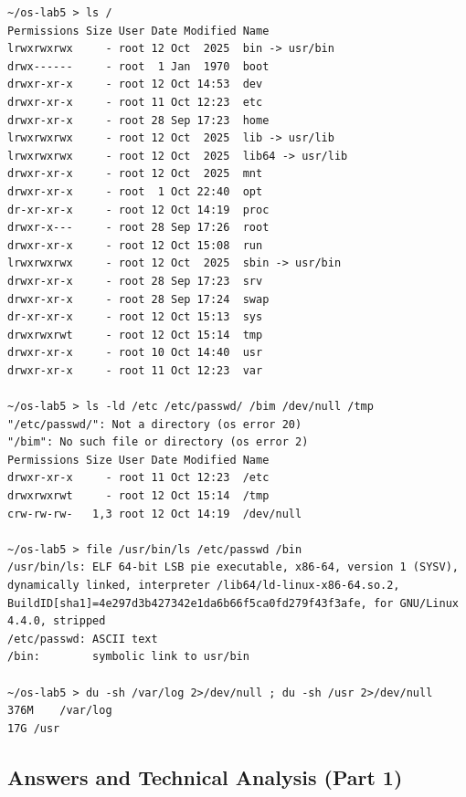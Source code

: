 \documentclass[12pt,a4paper]{article}
\begin{document}
\begin{lstlisting}[style=consolestyle]
~/os-lab5 > ls /
Permissions Size User Date Modified Name
lrwxrwxrwx     - root 12 Oct  2025  bin -> usr/bin
drwx------     - root  1 Jan  1970  boot
drwxr-xr-x     - root 12 Oct 14:53  dev
drwxr-xr-x     - root 11 Oct 12:23  etc
drwxr-xr-x     - root 28 Sep 17:23  home
lrwxrwxrwx     - root 12 Oct  2025  lib -> usr/lib
lrwxrwxrwx     - root 12 Oct  2025  lib64 -> usr/lib
drwxr-xr-x     - root 12 Oct  2025  mnt
drwxr-xr-x     - root  1 Oct 22:40  opt
dr-xr-xr-x     - root 12 Oct 14:19  proc
drwxr-x---     - root 28 Sep 17:26  root
drwxr-xr-x     - root 12 Oct 15:08  run
lrwxrwxrwx     - root 12 Oct  2025  sbin -> usr/bin
drwxr-xr-x     - root 28 Sep 17:23  srv
drwxr-xr-x     - root 28 Sep 17:24  swap
dr-xr-xr-x     - root 12 Oct 15:13  sys
drwxrwxrwt     - root 12 Oct 15:14  tmp
drwxr-xr-x     - root 10 Oct 14:40  usr
drwxr-xr-x     - root 11 Oct 12:23  var

~/os-lab5 > ls -ld /etc /etc/passwd/ /bim /dev/null /tmp
"/etc/passwd/": Not a directory (os error 20)
"/bim": No such file or directory (os error 2)
Permissions Size User Date Modified Name
drwxr-xr-x     - root 11 Oct 12:23  /etc
drwxrwxrwt     - root 12 Oct 15:14  /tmp
crw-rw-rw-   1,3 root 12 Oct 14:19  /dev/null

~/os-lab5 > file /usr/bin/ls /etc/passwd /bin
/usr/bin/ls: ELF 64-bit LSB pie executable, x86-64, version 1 (SYSV), dynamically linked, interpreter /lib64/ld-linux-x86-64.so.2, BuildID[sha1]=4e297d3b427342e1da6b66f5ca0fd279f43f3afe, for GNU/Linux 4.4.0, stripped
/etc/passwd: ASCII text
/bin:        symbolic link to usr/bin

~/os-lab5 > du -sh /var/log 2>/dev/null ; du -sh /usr 2>/dev/null
376M	/var/log
17G	/usr
\end{lstlisting}

\subsection{Answers and Technical Analysis (Part 1)}
\end{document}
